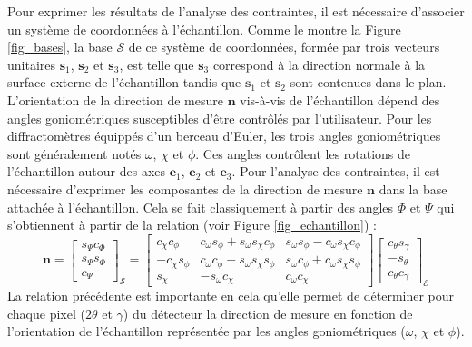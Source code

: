 \documentclass[french,a4paper]{report}
\begin{document}
Pour exprimer les résultats de l'analyse des contraintes, il est nécessaire d'associer un système de coordonnées à l'échantillon. Comme le montre la Figure \ref{fig_bases}, la base $\mathcal{S}$ de ce système de coordonnées, formée par trois vecteurs unitaires $\boldsymbol s_1$, $\boldsymbol s_2$ et $\boldsymbol s_3$, est telle que $\boldsymbol s_3$ correspond à la direction normale à la surface externe de l'échantillon tandis que $\boldsymbol s_1$ et $\boldsymbol s_2$ sont contenues dans le plan. L'orientation de la direction de mesure $\boldsymbol n$ vis-à-vis de l'échantillon dépend des angles goniométriques susceptibles d'être contrôlés par l'utilisateur. Pour les diffractomètres équippés d'un berceau d'Euler, les trois angles goniométriques sont généralement notés $\omega$, $\chi$ et $\phi$. Ces angles contrôlent les rotations de l'échantillon autour des axes $\boldsymbol e_1$, $\boldsymbol e_2$ et $\boldsymbol e_3$. Pour l'analyse des contraintes, il est nécessaire d'exprimer les composantes de la direction de mesure $\boldsymbol n$ dans la base attachée à l'échantillon. Cela se fait classiquement à partir des angles $\Phi$ et $\Psi$ qui s'obtiennent à partir de la relation (voir Figure \ref{fig_echantillon}) :
\begin{equation}
\boldsymbol n =
\begin{bmatrix}
s_\Psi c_\Phi \\
s_\Psi s_\Phi \\
c_\Psi 
\end{bmatrix}_{\mathcal{S}}
=
\begin{bmatrix}
c_\chi c_\phi & c_\omega s_\phi + s_\omega s_\chi c_\phi & s_\omega s_\phi - c_\omega s_\chi c_\phi \\
-c_\chi s_\phi  & c_\omega c_\phi - s_\omega s_\chi s_\phi &   s_\omega c_\phi + c_\omega s_\chi s_\phi\\
s_\chi & -s_\omega  c_\chi & c_\omega  c_\chi  
\end{bmatrix}
\begin{bmatrix}
c_\theta s_\gamma \\
-s_\theta  \\
c_\theta c_\gamma
\end{bmatrix}_{\mathcal{E}}
\end{equation}
La relation précédente est importante en cela qu'elle permet de déterminer pour chaque pixel ($2 \theta$ et $\gamma$) du détecteur la direction de mesure en fonction de l'orientation de l'échantillon représentée par les angles goniométriques ($\omega$, $\chi$ et $\phi$).
\end{document}
